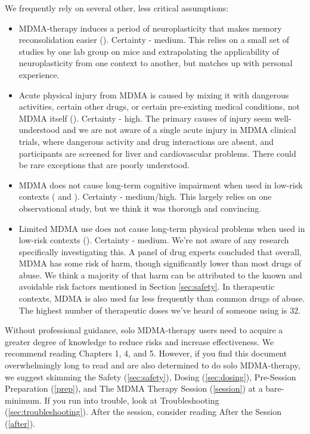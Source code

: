 \documentclass[12pt,letterpaper]{article}
\begin{document}
We frequently rely on several other, less critical assumptions:
\begin{itemize}
	\item MDMA-therapy induces a period of neuroplasticity that makes memory reconsolidation easier (\textcite{nardouMDMAPlasticity}). Certainty - medium. This relies on a small set of studies by one lab group on mice and extrapolating the applicability of neuroplasticity from one context to another, but matches up with personal experience.
	\item Acute physical injury from MDMA is caused by mixing it with dangerous activities, certain other drugs, or certain pre-existing medical conditions, not MDMA itself (\textcite{riggDeaths}). Certainty - high. The primary causes of injury seem well-understood and we are not aware of a single acute injury in MDMA clinical trials, where dangerous activity and drug interactions are absent, and participants are screened for liver and cardiovascular problems. There could be rare exceptions that are poorly understood.
	\item MDMA does not cause long-term cognitive impairment when used in low-risk contexts (\textcite{halpernMormonRavers} and \textcite{passieHistory}). Certainty - medium/high. This largely relies on one observational study, but we think it was thorough and convincing.
	\item Limited MDMA use does not cause long-term physical problems when used in low-risk contexts (\textcite{nuttDrugHarms}). Certainty - medium. We're not aware of any research specifically investigating this. A panel of drug experts concluded that overall, MDMA has some risk of harm, though significantly lower than most drugs of abuse. We think a majority of that harm can be attributed to the known and avoidable risk factors mentioned in Section \ref{sec:safety}. In therapeutic contexts, MDMA is also used far less frequently than common drugs of abuse. The highest number of therapeutic doses we've heard of someone using is 32.
\end{itemize}

Without professional guidance, solo MDMA-therapy users need to acquire a greater degree of knowledge to reduce risks and increase effectiveness. We recommend reading Chapters 1, 4, and 5. However, if you find this document overwhelmingly long to read and are also determined to do solo MDMA-therapy, we suggest skimming the Safety (\ref{sec:safety}), Dosing (\ref{sec:dosing}), Pre-Session Preparation (\ref{prep}), and The MDMA Therapy Session (\ref{session}) at a bare-minimum. If you run into trouble, look at Troubleshooting (\ref{sec:troubleshooting}). After the session, consider reading After the Session (\ref{after}).
\end{document}
